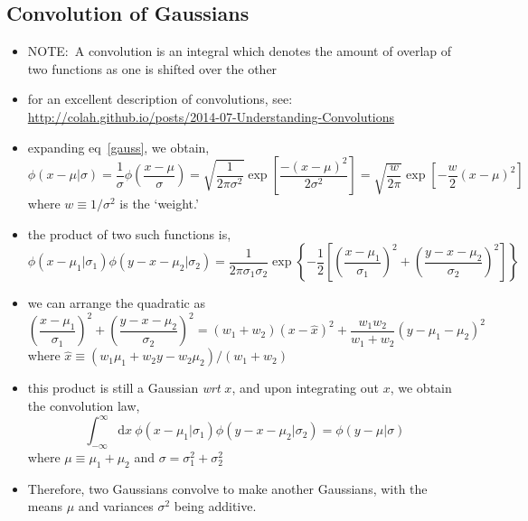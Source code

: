 \documentclass[../jaynes_prob_theory_notes.tex]{subfiles}
\begin{document}
        \subsection{Convolution of Gaussians}
            \begin{itemize}
                \item NOTE:\ A convolution is an integral which denotes the amount of overlap of two functions as one is shifted over the other 
				\item for an excellent description of convolutions, see: \url{http://colah.github.io/posts/2014-07-Understanding-Convolutions}
				\item expanding eq~\ref{gauss}, we obtain,
                    \begin{equation*}
                        {\phi}(x - {\mu}|{\sigma}) = \frac{1}{\sigma} {\phi} \left(\frac{x - \mu}{\sigma} \right) = \sqrt{\frac{1}{2{\pi}{\sigma}^2}} \exp \left[ \frac{-{(x - \mu)}^2}{2{\sigma}^2} \right] = \sqrt{\frac{w}{2\pi}} \exp \left[ -\frac{w}{2} {(x - \mu)}^2 \right]
                    \end{equation*}
                    where $w \equiv 1 / {\sigma}^2$ is the `weight.'
                \item the product of two such functions is,
                    \begin{equation*}
                        {\phi}(x - {\mu}_1|{\sigma}_1){\phi}(y-x-{\mu}_2|{\sigma}_2) = \frac{1}{2{\pi}{\sigma}_{1}{\sigma}_{2}} \exp \left \{ -\frac{1}{2} \left[ {\left( \frac{x-{\mu}_1}{{\sigma}_1} \right)}^2 + {\left( \frac{y-x-{\mu}_2}{{\sigma}_2} \right)}^2 \right]\right \}
                    \end{equation*}
                \item we can arrange the quadratic as
                    \begin{equation*}
                        {\left( \frac{x-{\mu}_1}{{\sigma}_1} \right)}^2 + {\left( \frac{y-x-{\mu}_2}{{\sigma}_2} \right)}^2 = (w_1 + w_2){(x - \hat{x})}^2 + \frac{w_1 w_2}{w_1 + w_2} {(y - {\mu}_1 - {\mu}_2)}^2
                    \end{equation*}
                    where $\hat{x} \equiv (w_1 {\mu}_1 + w_2 y - w_2 {\mu}_2)/(w_1 + w_2)$
                \item this product is still a Gaussian \textit{wrt} $x$, and upon integrating out $x$, we obtain the convolution law,
                    \begin{equation}
                        \label{gauss_convol}
                        \int^{\infty}_{-\infty} \mathrm{d}x~{\phi}(x-{\mu}_1|{\sigma}_1){\phi}(y-x-{\mu}_2|{\sigma}_2) = {\phi}(y-{\mu}|{\sigma})
                    \end{equation}
                    where $\mu \equiv {\mu}_1 + {\mu}_2$ and ${\sigma} = {\sigma}^2_1 + {\sigma}^2_2$
                \item Therefore, two Gaussians convolve to make another Gaussians, with the means $\mu$ and variances ${\sigma}^2$ being additive.
            \end{itemize}
        
\end{document}
